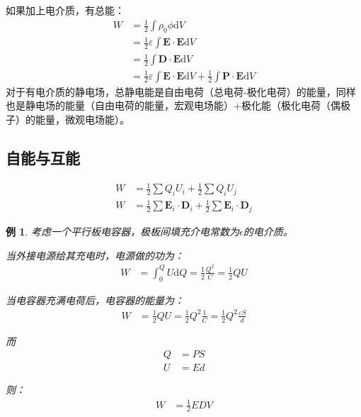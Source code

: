 \documentclass[12pt,onecolumn,a4paper]{book}
\newtheorem*{example}{例}
\numberwithin{table}{subsection}
\numberwithin{equation}{subsection}
\begin{document}
如果加上电介质，有总能：
\begin{align}
    W & = \frac{1}{2} \int \rho_0 \phi \mathrm{d} V                                                                                         \\
      & = \frac{1}{2} \varepsilon \int \mathbf{E} \cdot \mathbf{E} \mathrm{d} V                                                             \\
      & = \frac{1}{2} \int \mathbf{D} \cdot \mathbf{E} \mathrm{d} V                                                                         \\
      & = \frac{1}{2} \varepsilon \int \mathbf{E} \cdot \mathbf{E} \mathrm{d} V + \frac{1}{2} \int \mathbf{P} \cdot \mathbf{E} \mathrm{d} V
\end{align}
对于有电介质的静电场，总静电能是自由电荷（总电荷-极化电荷）的能量，同样也是静电场的能量（自由电荷的能量，宏观电场能）+极化能（极化电荷（偶极子）的能量，微观电场能）。

\subsection{自能与互能}

\begin{align}
    W & = \frac{1}{2} \sum Q_iU_i + \frac{1}{2} \sum Q_iU_j                                                   \\
    W & = \frac{1}{2} \sum \mathbf{E}_i \cdot \mathbf{D}_i + \frac{1}{2} \sum \mathbf{E}_i \cdot \mathbf{D}_j
\end{align}

\begin{example}
    考虑一个平行板电容器，极板间填充介电常数为$\epsilon$的电介质。

    当外接电源给其充电时，电源做的功为：
    \begin{align}
        W & = \int_0^Q U \mathrm{d} Q = \frac{1}{2} \frac{Q^2}{C} = \frac{1}{2} Q U
    \end{align}

    当电容器充满电荷后，电容器的能量为：
    \begin{align}
        W & = \frac{1}{2} Q U = \frac{1}{2} Q^2 \frac{1}{C} = \frac{1}{2} Q^2 \frac{\varepsilon S}{d}
    \end{align}

    而
    \begin{align}
        Q & = P S \\
        U & = E d
    \end{align}

    则：
    \begin{align}
        W & = \frac{1}{2} ED V
    \end{align}

\end{example}
\end{document}

